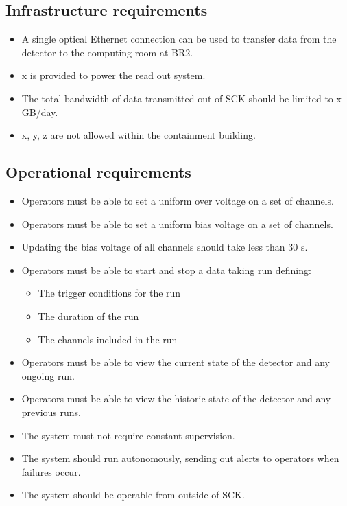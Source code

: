 \documentclass[a4paper]{article}
\begin{document}
\subsection{Infrastructure requirements}

\begin{itemize}
\item A single optical Ethernet connection can be used to transfer data from the detector to the computing room at BR2.
\item x is provided to power the read out system.
\item The total bandwidth of data transmitted out of SCK should be limited to x GB/day.
\item x, y, z are not allowed within the containment building.
\end{itemize}

\subsection{Operational requirements}

\begin{itemize}
\item Operators must be able to set a uniform over voltage on a set of channels. 
\item Operators must be able to set a uniform bias voltage on a set of channels.
\item Updating the bias voltage of all channels should take less than 30 s.
\item Operators must be able to start and stop a data taking run defining:
    \begin{itemize}
    \item The trigger conditions for the run
    \item The duration of the run
    \item The channels included in the run
    \end{itemize}
\item Operators must be able to view the current state of the detector and any ongoing run.
\item Operators must be able to view the historic state of the detector and any previous runs. 
\item The system must not require constant supervision.
\item The system should run autonomously, sending out alerts to operators when failures occur.
\item The system should be operable from outside of SCK.
\end{itemize}
\end{document}
